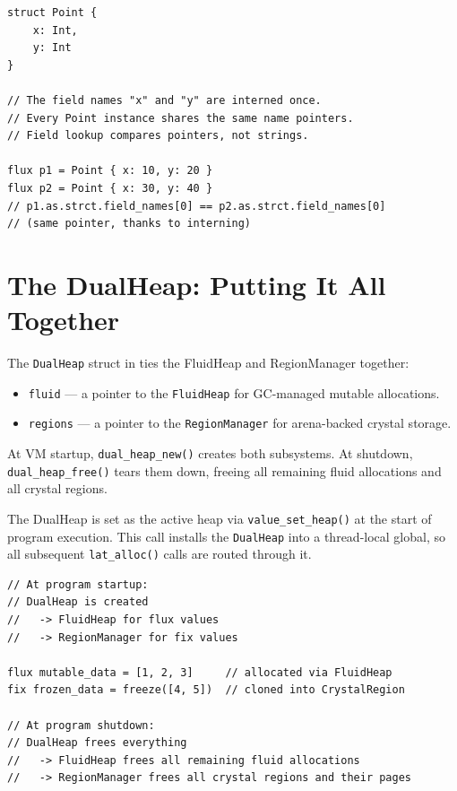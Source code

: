 \begin{lstlisting}[language=Lattice, caption={Interning makes struct operations faster}]
struct Point {
    x: Int,
    y: Int
}

// The field names "x" and "y" are interned once.
// Every Point instance shares the same name pointers.
// Field lookup compares pointers, not strings.

flux p1 = Point { x: 10, y: 20 }
flux p2 = Point { x: 30, y: 40 }
// p1.as.strct.field_names[0] == p2.as.strct.field_names[0]
// (same pointer, thanks to interning)
\end{lstlisting}


\section{The DualHeap: Putting It All Together}\label{sec:dual-heap}


The \lstinline|DualHeap| struct in  ties the FluidHeap and RegionManager together:

\begin{itemize}
  \item \lstinline|fluid| --- a pointer to the \lstinline|FluidHeap| for GC-managed mutable allocations.
  \item \lstinline|regions| --- a pointer to the \lstinline|RegionManager| for arena-backed crystal storage.
\end{itemize}

At VM startup, \lstinline|dual_heap_new()| creates both subsystems.
At shutdown, \lstinline|dual_heap_free()| tears them down, freeing all remaining fluid allocations and all crystal regions.

The DualHeap is set as the active heap via \lstinline|value_set_heap()| at the start of program execution.
This call installs the \lstinline|DualHeap| into a thread-local global, so all subsequent \lstinline|lat_alloc()| calls are routed through it.

\begin{lstlisting}[language=Lattice, caption={The DualHeap manages both worlds}]
// At program startup:
// DualHeap is created
//   -> FluidHeap for flux values
//   -> RegionManager for fix values

flux mutable_data = [1, 2, 3]     // allocated via FluidHeap
fix frozen_data = freeze([4, 5])  // cloned into CrystalRegion

// At program shutdown:
// DualHeap frees everything
//   -> FluidHeap frees all remaining fluid allocations
//   -> RegionManager frees all crystal regions and their pages
\end{lstlisting}

